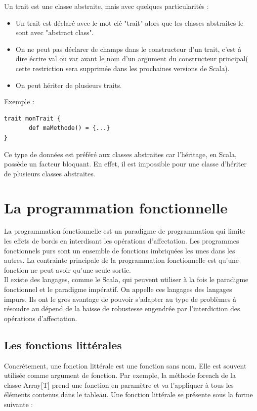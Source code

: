 \documentclass[a4paper,11pt]{report}
\begin{document}
{\normalsize{
Un trait est une classe abstraite, mais avec quelques particularités :
}

\begin{itemize}
\item Un trait est déclaré avec le mot clé "trait" alors que les classes abstraites le sont avec "abstract class".
\item On ne peut pas déclarer de champs dans le constructeur d'un trait, c'est à dire écrire val ou var avant le nom d'un argument du constructeur principal( cette restriction sera supprimée dans les prochaines versions de Scala). 
\item On peut hériter de plusieurs traits. \\
\end{itemize}

\newpage
\normalsize{
\noindent
Exemple :
}

\begin{lstlisting}
trait monTrait {
       def maMethode() = {...}
}
\end{lstlisting}
\vspace{6mm}


\normalsize{
Ce type de données est préféré aux classes abstraites car l'héritage, en Scala, possède un facteur bloquant. En effet, il est impossible pour une classe d'hériter de plusieurs classes abstraites. 
}

\section{La programmation fonctionnelle}
\vspace{6mm}
\normalsize{
La programmation fonctionnelle est un paradigme de programmation qui limite les effets de bords en interdisant les opérations d'affectation. Les programmes fonctionnels purs sont un ensemble de fonctions imbriquées les unes dans les autres. La contrainte principale de la programmation fonctionnelle est qu'une fonction ne peut avoir qu'une seule sortie.\\

 Il existe des langages, comme le Scala, qui peuvent utiliser à la fois le paradigme fonctionnel et le paradigme impératif. On appelle ces langages des langages impurs. Ils ont le gros avantage de pouvoir s'adapter au type de problèmes à résoudre au dépend de la baisse de robustesse engendrée par l'interdiction des opérations d'affectation.

\subsection{Les fonctions littérales}
\vspace{6mm}
\normalsize{
Concrètement, une fonction littérale est une fonction sans nom. Elle est souvent utilisée comme argument de fonction. Par exemple, la méthode foreach de la classe Array[T] prend une fonction en paramètre et va l'appliquer à tous les éléments contenus dans le tableau. Une fonction littérale se présente sous la forme suivante : \\
}

}}
\end{document}
